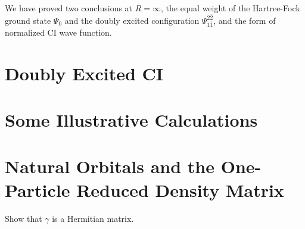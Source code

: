 \documentclass[a4paper]{book}
\newcounter{exercise}[chapter]
\newcounter{solution}[chapter]
\begin{document}
\begin{solution}
	We have proved two conclusions at $R = \infty$, the equal weight of the Hartree-Fock ground state $\Psi_0$ and the doubly excited configuration $\Psi^{2 \bar{2}}_{1 \bar{1}}$, and the form of normalized CI wave function.
		
	\end{solution}
	
	\section{Doubly Excited CI}
	
	\section{Some Illustrative Calculations}
	
	\section{Natural Orbitals and the One-Particle Reduced Density Matrix}
	
	\begin{exercise}
	Show that $\gamma$ is a Hermitian matrix.
	\end{exercise}
	
\end{document}
